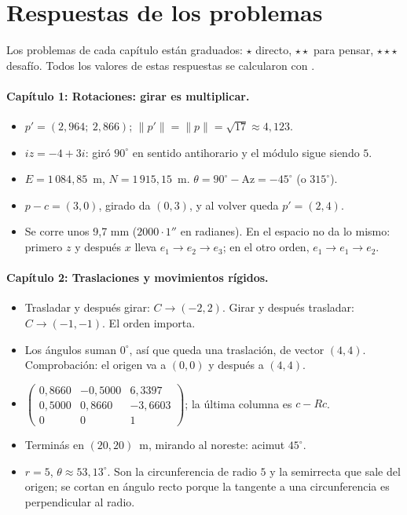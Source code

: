 \section{Respuestas de los problemas}\label{cap:respuestas}\label{ap:respuestas}

Los problemas de cada capítulo están graduados: \({\star}\) directo, \({\star}{\star}\) para pensar, \({\star}{\star}{\star}\) desafío. Todos los valores de estas respuestas se calcularon con .

\paragraph{Capítulo 1: Rotaciones: girar es multiplicar.}
\begin{itemize}
  \item[\ref{pb:01-1}] \(p'=(2{,}964;\ 2{,}866)\); \(\lVert p'\rVert=\lVert p\rVert=\sqrt{17}\approx4{,}123\).
  \item[\ref{pb:01-2}] \(iz=-4+3i\): giró \(90^\circ\) en sentido antihorario y el módulo sigue siendo \(5\).
  \item[\ref{pb:01-3}] \(E=1\,084{,}85\)~m, \(N=1\,915{,}15\)~m. \(\theta=90^\circ-\mathrm{Az}=-45^\circ\) (o \(315^\circ\)).
  \item[\ref{pb:01-4}] \(p-c=(3,0)\), girado da \((0,3)\), y al volver queda \(p'=(2,4)\).
  \item[\ref{pb:01-5}] Se corre unos 9{,}7 mm (\(2000\cdot 1''\) en radianes). En el espacio no da lo mismo: primero \(z\) y después \(x\) lleva \(e_1\to e_2\to e_3\); en el otro orden, \(e_1\to e_1\to e_2\).
\end{itemize}

\paragraph{Capítulo 2: Traslaciones y movimientos rígidos.}
\begin{itemize}
  \item[\ref{pb:02-1}] Trasladar y después girar: \(C\to(-2,2)\). Girar y después trasladar: \(C\to(-1,-1)\). El orden importa.
  \item[\ref{pb:02-2}] Los ángulos suman \(0^\circ\), así que queda una traslación, de vector \((4,4)\). Comprobación: el origen va a \((0,0)\) y después a \((4,4)\).
  \item[\ref{pb:02-3}] \(\begin{pmatrix}0{,}8660&-0{,}5000&6{,}3397\\0{,}5000&0{,}8660&-3{,}6603\\0&0&1\end{pmatrix}\); la última columna es \(c-Rc\).
  \item[\ref{pb:02-4}] Terminás en \((20,20)\)~m, mirando al noreste: acimut \(45^\circ\).
  \item[\ref{pb:02-5}] \(r=5\), \(\theta\approx53{,}13^\circ\). Son la circunferencia de radio \(5\) y la semirrecta que sale del origen; se cortan en ángulo recto porque la tangente a una circunferencia es perpendicular al radio.
\end{itemize}

